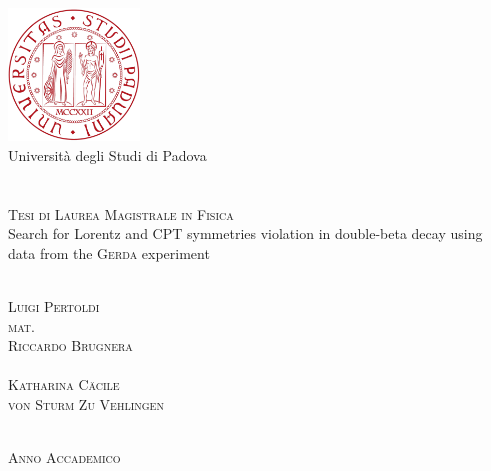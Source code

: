\documentclass[11pt, a4paper, twoside]{article}
\begin{document}
\begin{titlepage}
	\thispagestyle{empty}
	\begin{center}
	\includegraphics[width=3.5cm]{img/logo.pdf} \\
	\vspace{0.5cm}
	{\Large Universit\`a degli Studi di Padova} \\
	\hrulefill \\
	 \\
	\vspace{2cm}
	\textsc{\large Tesi di Laurea Magistrale in Fisica} \\
	\vspace{3cm}
	\huge{Search for Lorentz and CPT symmetries violation in double-beta decay using data from the \textsc{Gerda} experiment}
	\end{center}
	\vspace{3cm}
	\begin{multicols}{2}
	\large
	\noindent
	 \\
	\textsc{Luigi Pertoldi} \\
	\normalsize{\textsc{mat.}~}
	\columnbreak
	\flushright
	 \\
	\textsc{Riccardo Brugnera} \\
	\vspace{5mm}
	 \\
	\textsc{Katharina Cäcile\\von Sturm Zu Vehlingen}
	\end{multicols}
	\vspace*{\fill}
	\begin{center}
	\hrulefill \\
	\textsc{Anno Accademico }
	\end{center}
\end{titlepage}
\restoregeometry
%
%
%

%
%


\end{document}

